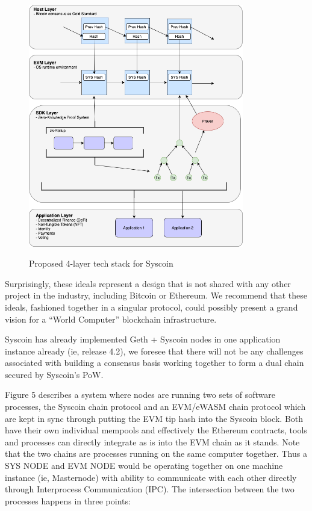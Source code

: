\documentclass[peerreview]{ieeesyscoin}
\begin{document}
\begin{figure}[h!]
\includegraphics[width=3.7in]{img/4_layer.png}
\label{fig:tech_stack}
\caption{Proposed 4-layer tech stack for Syscoin} 
\end{figure} 

Surprisingly, these ideals represent a design that is not shared with any other project in the industry, including Bitcoin or Ethereum. We recommend that these ideals, fashioned together in a singular protocol, could possibly present a grand vision for a “World Computer” blockchain infrastructure.

Syscoin has already implemented Geth + Syscoin nodes in one application instance already (ie, release 4.2), we foresee that there will not be any challenges associated with building a consensus basis working together to form a dual chain secured by Syscoin’s PoW.

Figure 5 describes a system where nodes are running two sets of software processes, the Syscoin chain protocol and an EVM/eWASM chain protocol which are kept in sync through putting the EVM tip hash into the Syscoin block. Both have their own individual mempools and effectively the Ethereum contracts, tools and processes can directly integrate as is into the EVM chain as it stands. Note that the two chains are processes running on the same computer together. Thus a SYS NODE and EVM NODE would be operating together on one machine instance (ie, Masternode) with ability to communicate with each other directly through Interprocess Communication (IPC). The intersection between the two processes happens in three points:
\end{document}
